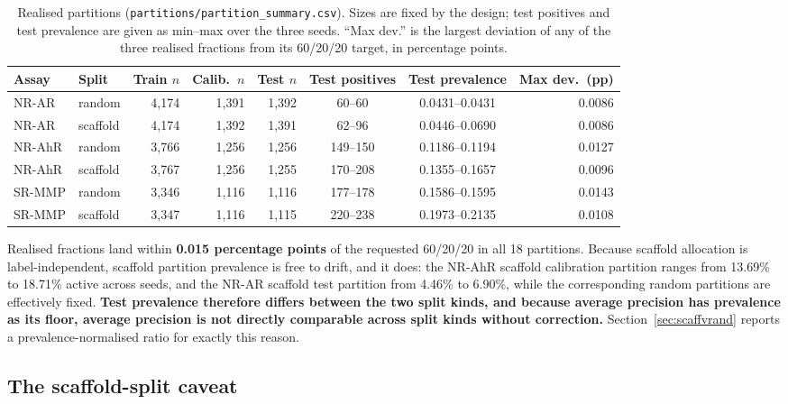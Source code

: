 \documentclass[10pt,letterpaper]{article}
\begin{document}
\begin{table}[!htbp]
\centering
\footnotesize
\caption{Realised partitions (\texttt{partitions/partition\_summary.csv}). Sizes are fixed by the
design; test positives and test prevalence are given as min--max over the three seeds. ``Max dev.''
is the largest deviation of any of the three realised fractions from its 60/20/20 target, in
percentage points.}
\label{tab:partitions}
\begin{tabular}{@{}llrrrccr@{}}
\toprule
Assay & Split & Train $n$ & Calib.\ $n$ & Test $n$ & Test positives & Test prevalence & Max dev.\ (pp) \\
\midrule
NR-AR  & random   & 4{,}174 & 1{,}391 & 1{,}392 & 60--60   & 0.0431--0.0431 & 0.0086 \\
NR-AR  & scaffold & 4{,}174 & 1{,}392 & 1{,}391 & 62--96   & 0.0446--0.0690 & 0.0086 \\
NR-AhR & random   & 3{,}766 & 1{,}256 & 1{,}256 & 149--150 & 0.1186--0.1194 & 0.0127 \\
NR-AhR & scaffold & 3{,}767 & 1{,}256 & 1{,}255 & 170--208 & 0.1355--0.1657 & 0.0096 \\
SR-MMP & random   & 3{,}346 & 1{,}116 & 1{,}116 & 177--178 & 0.1586--0.1595 & 0.0143 \\
SR-MMP & scaffold & 3{,}347 & 1{,}116 & 1{,}115 & 220--238 & 0.1973--0.2135 & 0.0108 \\
\bottomrule
\end{tabular}
\end{table}

Realised fractions land within \textbf{0.015 percentage points} of the requested 60/20/20 in all 18
partitions. Because scaffold allocation is label-independent, scaffold partition prevalence is free
to drift, and it does: the NR-AhR scaffold calibration partition ranges from 13.69\% to 18.71\%
active across seeds, and the NR-AR scaffold test partition from 4.46\% to 6.90\%, while the
corresponding random partitions are effectively fixed. \textbf{Test prevalence therefore differs
between the two split kinds, and because average precision has prevalence as its floor, average
precision is not directly comparable across split kinds without correction.}
Section~\ref{sec:scaffvrand} reports a prevalence-normalised ratio for exactly this reason.

\subsection{The scaffold-split caveat}
\label{sec:scaffcaveat}
\end{document}
